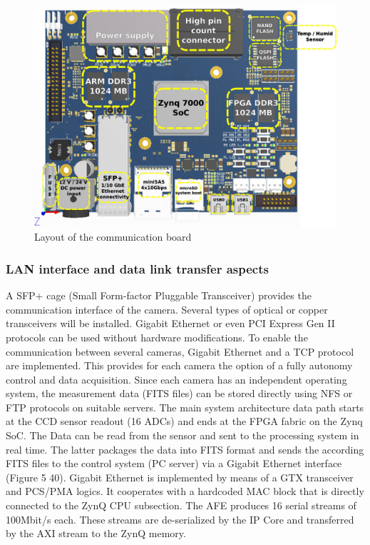 \begin{figure}[H]
\centering
\includegraphics[width=\textwidth]{pict/commbrd_layout.jpg}
\caption{Layout of the communication board}
\label{fig:commbrd_layout}
\end{figure}

\subsubsection{LAN interface and data link transfer aspects}
A SFP+ cage (Small Form-factor Pluggable Transceiver) provides the communication interface of the camera. Several types of optical or copper transceivers will be installed. Gigabit Ethernet or even PCI Express Gen II protocols can be used without hardware modifications.
To enable the communication between several cameras, Gigabit Ethernet and a TCP protocol are implemented. This provides for each camera the option of a fully autonomy control and data acquisition. Since each camera has an independent operating system, the measurement data (FITS files) can be stored directly using NFS or FTP protocols on suitable servers.
The main system architecture data path starts at the CCD sensor readout (16 ADCs) and ends at the FPGA fabric on the Zynq SoC. The Data can be read from the sensor and sent to the processing system in real time. The latter packages the data into FITS format and sends the according FITS files to the control system (PC server) via a Gigabit Ethernet interface (Figure 5 40). Gigabit Ethernet is implemented by means of a GTX transceiver and PCS/PMA logics. It cooperates with a hardcoded MAC block that is directly connected to the ZynQ CPU subsection.
The AFE produces 16 serial streams of 100Mbit/s each. These streams are de-serialized by the IP Core and transferred by the AXI stream to the ZynQ memory.

